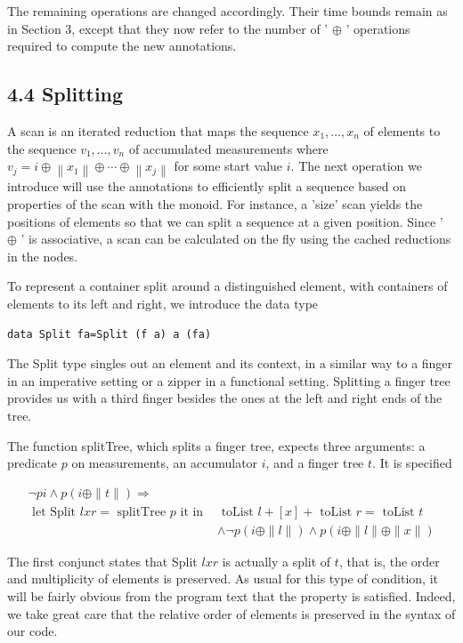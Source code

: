 \documentclass[10pt]{article}
\begin{document}
The remaining operations are changed accordingly. Their time bounds remain as in Section 3, except that they now refer to the number of ' $\oplus$ ' operations required to compute the new annotations.

\subsection*{4.4 Splitting}
A scan is an iterated reduction that maps the sequence $x_{1}, \ldots, x_{n}$ of elements to the sequence $v_{1}, \ldots, v_{n}$ of accumulated measurements where $v_{j}=i \oplus\left\|x_{1}\right\| \oplus \cdots \oplus\left\|x_{j}\right\|$ for some start value $i$. The next operation we introduce will use the annotations to efficiently split a sequence based on properties of the scan with the monoid. For instance, a 'size' scan yields the positions of elements so that we can split a sequence at a given position. Since ' $\oplus$ ' is associative, a scan can be calculated on the fly using the cached reductions in the nodes.

To represent a container split around a distinguished element, with containers of elements to its left and right, we introduce the data type

\begin{verbatim}
data Split fa=Split (f a) a (fa)
\end{verbatim}

The Split type singles out an element and its context, in a similar way to a finger in an imperative setting or a zipper in a functional setting. Splitting a finger tree provides us with a third finger besides the ones at the left and right ends of the tree.

The function splitTree, which splits a finger tree, expects three arguments: a predicate $p$ on measurements, an accumulator $i$, and a finger tree $t$. It is specified

$$
\begin{aligned}
\neg p i \wedge p(i \oplus\|t\|) \Longrightarrow & \\
\text { let Split } l x r=\text { splitTree } p \text { it in } & \text { toList } l+[x]+\text { toList } r=\text { toList } t \\
& \wedge \neg p(i \oplus\|l\|) \wedge p(i \oplus\|l\| \oplus\|x\|)
\end{aligned}
$$

The first conjunct states that Split $l x r$ is actually a split of $t$, that is, the order and multiplicity of elements is preserved. As usual for this type of condition, it will be fairly obvious from the program text that the property is satisfied. Indeed, we take great care that the relative order of elements is preserved in the syntax of our code.
\end{document}

